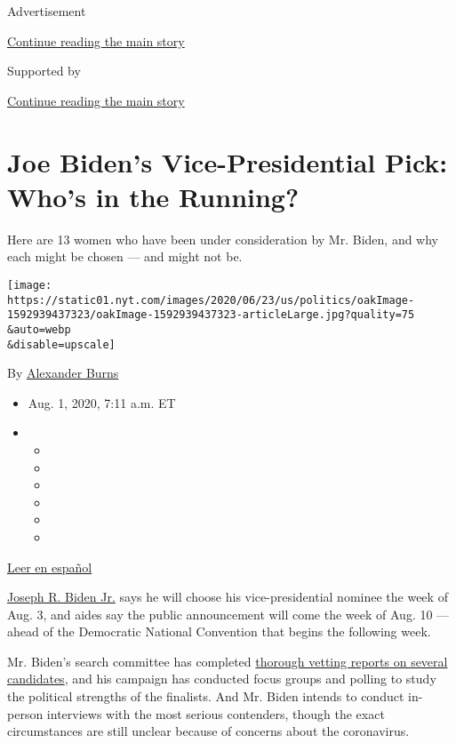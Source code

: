 Advertisement

\protect\hyperlink{after-top}{Continue reading the main story}

Supported by

\protect\hyperlink{after-sponsor}{Continue reading the main story}

\hypertarget{joe-bidens-vice-presidential-pick-whos-in-the-running}{%
\section{Joe Biden's Vice-Presidential Pick: Who's in the
Running?}\label{joe-bidens-vice-presidential-pick-whos-in-the-running}}

Here are 13 women who have been under consideration by Mr. Biden, and
why each might be chosen --- and might not be.

\texttt{[image: https://static01.nyt.com/images/2020/06/23/us/politics/oakImage-1592939437323/oakImage-1592939437323-articleLarge.jpg?quality=75\\\&auto=webp\\\&disable=upscale]}

By \href{https://www.nytimes.com/by/alexander-burns}{Alexander Burns}

\begin{itemize}
\item
  Aug. 1, 2020, 7:11 a.m. ET
\item
  \begin{itemize}
  \item
  \item
  \item
  \item
  \item
  \item
  \end{itemize}
\end{itemize}

\href{https://www.nytimes.com/es/2020/07/29/espanol/estados-unidos/biden-vicepresidente.html}{Leer
en español}

\href{https://www.nytimes.com/interactive/2020/us/elections/joe-biden.html}{Joseph
R. Biden Jr.} says he will choose his vice-presidential nominee the week
of Aug. 3, and aides say the public announcement will come the week of
Aug. 10 --- ahead of the Democratic National Convention that begins the
following week.

Mr. Biden's search committee has completed
\href{https://www.nytimes.com/2020/07/31/us/politics/joseph-biden-vice-president.html}{thorough
vetting reports on several candidates}, and his campaign has conducted
focus groups and polling to study the political strengths of the
finalists. And Mr. Biden intends to conduct in-person interviews with
the most serious contenders, though the exact circumstances are still
unclear because of concerns about the coronavirus.

